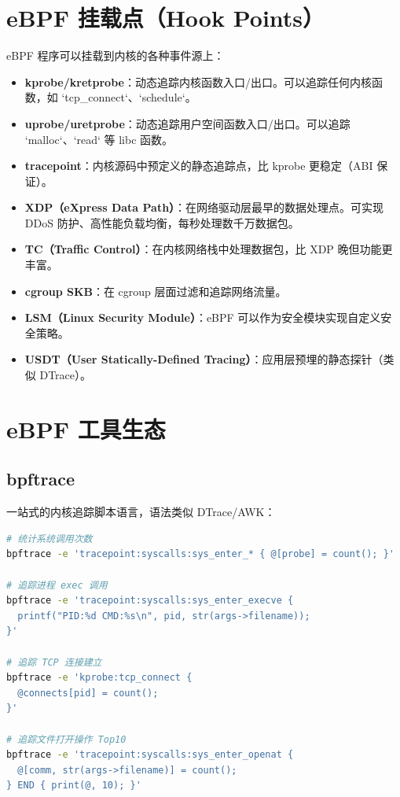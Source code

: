 \documentclass[12pt,UTF8]{ctexbook}
\begin{document}
\section{eBPF 挂载点（Hook Points）}
\label{sec:ebpf-hooks}

eBPF 程序可以挂载到内核的各种事件源上：

\begin{itemize}
    \item \textbf{kprobe/kretprobe}：动态追踪内核函数入口/出口。可以追踪任何内核函数，如 `tcp\_connect`、`schedule`。
    \item \textbf{uprobe/uretprobe}：动态追踪用户空间函数入口/出口。可以追踪 `malloc`、`read` 等 libc 函数。
    \item \textbf{tracepoint}：内核源码中预定义的静态追踪点，比 kprobe 更稳定（ABI 保证）。
    \item \textbf{XDP（eXpress Data Path）}：在网络驱动层最早的数据处理点。可实现 DDoS 防护、高性能负载均衡，每秒处理数千万数据包。
    \item \textbf{TC（Traffic Control）}：在内核网络栈中处理数据包，比 XDP 晚但功能更丰富。
    \item \textbf{cgroup SKB}：在 cgroup 层面过滤和追踪网络流量。
    \item \textbf{LSM（Linux Security Module）}：eBPF 可以作为安全模块实现自定义安全策略。
    \item \textbf{USDT（User Statically-Defined Tracing）}：应用层预埋的静态探针（类似 DTrace）。
\end{itemize}

\section{eBPF 工具生态}
\label{sec:ebpf-tools}

\subsection*{bpftrace}

一站式的内核追踪脚本语言，语法类似 DTrace/AWK：

\begin{lstlisting}[language=bash]
# 统计系统调用次数
bpftrace -e 'tracepoint:syscalls:sys_enter_* { @[probe] = count(); }'

# 追踪进程 exec 调用
bpftrace -e 'tracepoint:syscalls:sys_enter_execve { 
  printf("PID:%d CMD:%s\n", pid, str(args->filename)); 
}'

# 追踪 TCP 连接建立
bpftrace -e 'kprobe:tcp_connect { 
  @connects[pid] = count(); 
}'

# 追踪文件打开操作 Top10
bpftrace -e 'tracepoint:syscalls:sys_enter_openat { 
  @[comm, str(args->filename)] = count(); 
} END { print(@, 10); }'
\end{lstlisting}
\end{document}
